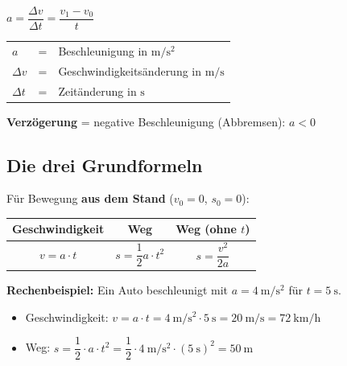 \documentclass[11pt, a4paper]{article}
\begin{document}
\begin{formelbox}[title=Beschleunigung]
\begin{center}
{\Large $a = \dfrac{\Delta v}{\Delta t} = \dfrac{v_1 - v_0}{t}$}
\end{center}
\vspace{0.3em}
\begin{tabular}{lll}
$a$ & = & Beschleunigung in $\si{\metre\per\second\squared}$ \\
$\Delta v$ & = & Geschwindigkeitsänderung in $\si{\metre\per\second}$ \\
$\Delta t$ & = & Zeitänderung in $\si{\second}$ \\
\end{tabular}
\end{formelbox}

\begin{warnbox}
\textbf{Verzögerung} = negative Beschleunigung (Abbremsen): $a < 0$
\end{warnbox}

\subsection{Die drei Grundformeln}

Für Bewegung \textbf{aus dem Stand} ($v_0 = 0$, $s_0 = 0$):

\begin{formelbox}[title=Formeln der gleichmäßig beschleunigten Bewegung]
\begin{center}
\renewcommand{\arraystretch}{2.5}
\begin{tabular}{|c|c|c|}
\hline
\textbf{Geschwindigkeit} & \textbf{Weg} & \textbf{Weg (ohne $t$)} \\
\hline
$v = a \cdot t$ & $s = \dfrac{1}{2} a \cdot t^2$ & $s = \dfrac{v^2}{2a}$ \\
\hline
\end{tabular}
\end{center}
\end{formelbox}

\begin{beispielbox}
\textbf{Rechenbeispiel:} Ein Auto beschleunigt mit $a = \SI{4}{\metre\per\second\squared}$ für $t = \SI{5}{\second}$.

\begin{itemize}[leftmargin=1em]
    \item Geschwindigkeit: $v = a \cdot t = \SI{4}{\metre\per\second\squared} \cdot \SI{5}{\second} = \SI{20}{\metre\per\second} = \SI{72}{\kilo\metre\per\hour}$
    \item Weg: $s = \dfrac{1}{2} \cdot a \cdot t^2 = \dfrac{1}{2} \cdot \SI{4}{\metre\per\second\squared} \cdot (\SI{5}{\second})^2 = \SI{50}{\metre}$
\end{itemize}
\end{beispielbox}
\end{document}

